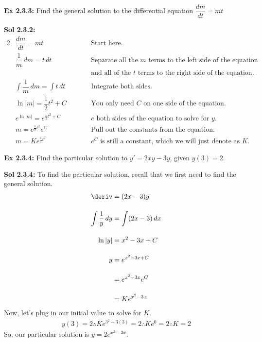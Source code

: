 \begin{tcolorbox}[example]
    \textbf{Ex 2.3.3: } Find the general solution to the differential equation $\dfrac{dm}{dt} = mt$
\end{tcolorbox}
\begin{tcolorbox}[solution]
    \textbf{Sol 2.3.2: } \vspace{11pt} \begin{alignat*}{2}
        & \dfrac{dm}{dt} = mt &\qquad& \text{Start here.} \\[11pt]
        & \dfrac{1}{m} \, dm = t \, dt &\qquad& \text{Separate all the $m$ terms to the left side of the equation} \\
        & &\qquad& \text{and all of the $t$ terms to the right side of the equation.} \\[11pt]
        & \int \dfrac{1}{m} \, dm = \int t \, dt &\qquad& \text{Integrate both sides.} \\[11pt]
        & \ln |m| = \dfrac{1}{2}t^2 + C &\qquad& \text{You only need $C$ on one side of the equation.} \\[11pt]
        & e^{\ln |m|} = e^{\frac{1}{2}t^2 + C} &\qquad& \text{$e$ both sides of the equation to solve for $y$.} \\[11pt]
        & m = e^{\frac{1}{2}t^2}e^C &\qquad& \text{Pull out the constants from the equation.} \\[11pt]
        & m = Ke^{\frac{1}{2}t^2} &\qquad& \text{$e^C$ is still a constant, which we will just denote as $K$.}
    \end{alignat*}
\end{tcolorbox} \vspace{11pt}

\begin{tcolorbox}[example]
    \textbf{Ex 2.3.4: } Find the particular solution to $y' = 2xy - 3y$, given $y(3) = 2$.
\end{tcolorbox}
\begin{tcolorbox}[solution]
    \textbf{Sol 2.3.4: } To find the particular solution, recall that we first need to find the general solution. \begin{align*}
        \deriv &= (2x - 3)y \\[11pt]
        \int \dfrac{1}{y} \, dy &= \int (2x - 3) \, dx \\[11pt]
        \ln |y| &= x^2 - 3x + C \\[11pt]
        y &\begin{aligned}[t]
            & = e^{x^2 - 3x + C} \\[11pt]
            & = e^{x^2 - 3x}e^C \\[11pt]
            & = Ke^{x^2 - 3x}
        \end{aligned}
    \end{align*}
    Now, let's plug in our initial value to solve for $K$. \begin{align*}
        y(3) = 2 \therefore Ke^{3^2 - 3(3)} = 2 \therefore Ke^0 = 2 \therefore K = 2
    \end{align*}
    So, our particular solution is $\boxed{y = 2e^{x^2 - 3x}}$.
\end{tcolorbox} \vspace{11pt}


